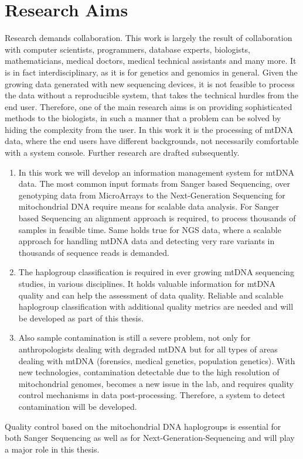 \section{Research Aims}
\label{researchaims}
Research demands collaboration. This work is largely the result of collaboration with computer scientists, programmers, database experts, biologists, mathematicians, medical doctors, medical technical assistants and many more. It is in fact interdisciplinary, as it is for genetics and genomics in general. Given the growing data generated with new sequencing devices, it is not feasible to process the data without a reproducible system, that takes the technical hurdles from the end user. Therefore, one of the main research aims is on providing sophisticated methods to the biologists, in such a manner that a problem can be solved by hiding the complexity from the user. In this work it is the processing of mtDNA data, where the end users have different backgrounds, not necessarily comfortable with a system console. Further research are drafted subsequently.
\begin{enumerate}
\item
In this work we will develop an information management system for mtDNA data. 
The most common input formats from Sanger based Sequencing, over genotyping data from MicroArrays to the Next-Generation Sequencing for mitochondrial DNA require means for scalable data analysis. 
For Sanger based Sequencing an alignment approach is required, to process thousands of samples in feasible time. Same holds true for NGS data, where a scalable approach for handling mtDNA data and detecting very rare variants in thousands of sequence reads is demanded.
\item The haplogroup classification is required in ever growing mtDNA sequencing studies, in various disciplines. It holds valuable information for mtDNA quality and can help the assessment of data quality. Reliable and scalable haplogroup classification with additional quality metrics are needed and will be developed as part of this thesis.
\item Also sample contamination is still a severe problem, not only for anthropologists dealing with degraded mtDNA but for all types of areas dealing with mtDNA (forensics, medical genetics, population genetics). With new technologies, contamination detectable due to the high resolution of mitochondrial genomes, becomes a new issue in the lab, and requires quality control mechanisms in data post-processing. Therefore, a system to detect contamination will be developed. 
\end{enumerate}
Quality control based on the mitochondrial DNA haplogroups is essential for both Sanger Sequencing as well as for Next-Generation-Sequencing and will play a major role in this thesis.

